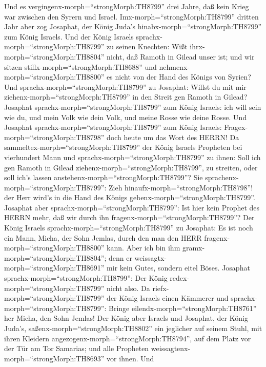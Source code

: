  Und es vergingenx-morph=``strongMorph:TH8799'' drei Jahre,
daß kein Krieg war zwischen den Syrern und Israel. 
Imx-morph=``strongMorph:TH8799'' dritten Jahr aber zog Josaphat, der
König Juda's hinabx-morph=``strongMorph:TH8799'' zum König Israels.
 Und der König Israels sprachx-morph=``strongMorph:TH8799''
zu seinen Knechten: Wißt ihrx-morph=``strongMorph:TH8804'' nicht, daß
Ramoth in Gilead unser ist; und wir sitzen
stillx-morph=``strongMorph:TH8688'' und
nehmenx-morph=``strongMorph:TH8800'' es nicht von der Hand des Königs
von Syrien?  Und sprachx-morph=``strongMorph:TH8799'' zu
Josaphat: Willst du mit mir ziehenx-morph=``strongMorph:TH8799'' in den
Streit gen Ramoth in Gilead? Josaphat
sprachx-morph=``strongMorph:TH8799'' zum König Israels: ich will sein
wie du, und mein Volk wie dein Volk, und meine Rosse wie deine Rosse.
 Und Josaphat sprachx-morph=``strongMorph:TH8799'' zum König
Israels: Fragex-morph=``strongMorph:TH8798'' doch heute um das Wort des
HERRN!  Da sammeltex-morph=``strongMorph:TH8799'' der König
Israels Propheten bei vierhundert Mann und
sprachx-morph=``strongMorph:TH8799'' zu ihnen: Soll ich gen Ramoth in
Gilead ziehenx-morph=``strongMorph:TH8799'', zu streiten, oder soll
ich's lassen anstehenx-morph=``strongMorph:TH8799''? Sie
sprachenx-morph=``strongMorph:TH8799'': Zieh
hinaufx-morph=``strongMorph:TH8798''! der Herr wird's in die Hand des
Königs gebenx-morph=``strongMorph:TH8799''.  Josaphat aber
sprachx-morph=``strongMorph:TH8799'': Ist hier kein Prophet des HERRN
mehr, daß wir durch ihn fragenx-morph=``strongMorph:TH8799''?
 Der König Israels sprachx-morph=``strongMorph:TH8799'' zu
Josaphat: Es ist noch ein Mann, Micha, der Sohn Jemlas, durch den man
den HERR fragenx-morph=``strongMorph:TH8800'' kann. Aber ich bin ihm
gramx-morph=``strongMorph:TH8804''; denn er
weissagtx-morph=``strongMorph:TH8691'' mir kein Gutes, sondern eitel
Böses. Josaphat sprachx-morph=``strongMorph:TH8799'': Der König
redex-morph=``strongMorph:TH8799'' nicht also.  Da
riefx-morph=``strongMorph:TH8799'' der König Israels einen Kämmerer und
sprachx-morph=``strongMorph:TH8799'': Bringe
eilendx-morph=``strongMorph:TH8761'' her Micha, den Sohn Jemlas!
 Der König aber Israels und Josaphat, der König Juda's,
saßenx-morph=``strongMorph:TH8802'' ein jeglicher auf seinem Stuhl, mit
ihren Kleidern angezogenx-morph=``strongMorph:TH8794'', auf dem Platz
vor der Tür am Tor Samarias; und alle Propheten
weissagtenx-morph=``strongMorph:TH8693'' vor ihnen.  Und
